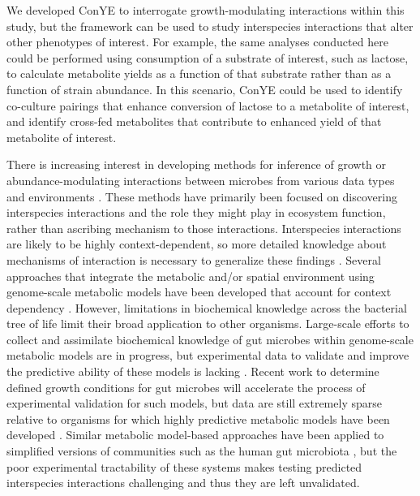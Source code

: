 \documentclass[11pt,twocolumn,notitlepage,openany,twoside]{book}
\begin{document}
\begin{refsection}
We developed ConYE to interrogate growth-modulating interactions within this study, but the framework can be used to study interspecies interactions that alter other phenotypes of interest. For example, the same analyses conducted here could be performed using consumption of a substrate of interest, such as lactose, to calculate metabolite yields as a function of that substrate rather than as a function of strain abundance. In this scenario, ConYE could be used to identify co-culture pairings that enhance conversion of lactose to a metabolite of interest, and identify cross-fed metabolites that contribute to enhanced yield of that metabolite of interest.

There is increasing interest in developing methods for inference of growth or abundance-modulating interactions between microbes from various data types and environments \cite{Friedman2017-zn,Weiss2016-tq,Xiao2017-yl}. These methods have primarily been focused on discovering interspecies interactions and the role they might play in ecosystem function, rather than ascribing mechanism to those interactions. Interspecies interactions are likely to be highly context-dependent, so more detailed knowledge about mechanisms of interaction is necessary to generalize these findings \cite{Chamberlain2014-nt}. Several approaches that integrate the metabolic and/or spatial environment using genome-scale metabolic models have been developed that account for context dependency \cite{Chan2017-tk,Harcombe2014-ev,Zomorrodi2012-ja}. However, limitations in biochemical knowledge across the bacterial tree of life limit their broad application to other organisms. Large-scale efforts to collect and assimilate biochemical knowledge of gut microbes within genome-scale metabolic models are in progress, but experimental data to validate and improve the predictive ability of these models is lacking \cite{Magnusdottir2017-dk}. Recent work to determine defined growth conditions for gut microbes will accelerate the process of experimental validation for such models, but data are still extremely sparse relative to organisms for which highly predictive metabolic models have been developed \cite{Tramontano2018-xz}. Similar metabolic model-based approaches have been applied to simplified versions of communities such as the human gut microbiota \cite{Bauer2017-kf,Chan2017-tk}, but the poor experimental tractability of these systems makes testing predicted interspecies interactions challenging and thus they are left unvalidated.


\end{refsection}
\end{document}

